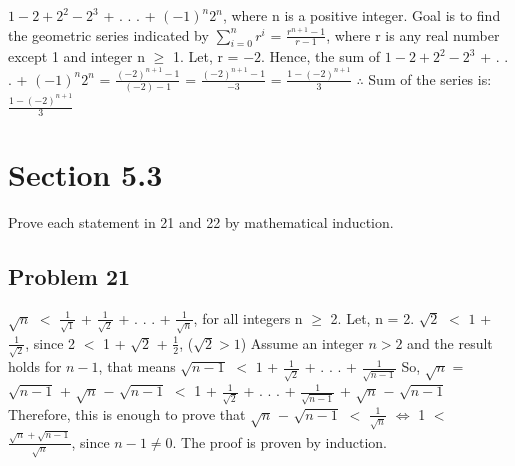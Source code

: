 \documentclass{article}
\begin{document}
	$1 - 2 + 2^{2} - 2^{3}$ + . . . + $(-1)^{n}$$2^{n}$, where n is a positive integer.
	\newline
	Goal is to find the geometric series indicated by $\sum_{i=0}^{n} r^{i}$ = $\frac{r^{n+1}-1}{r-1}$, where r is any real number except 1 and integer n $\geq$ 1.
	\newline
	Let, r = $-2$.
	\newline
	Hence, the sum of $1 - 2 + 2^{2} - 2^{3}$ + . . . + $(-1)^{n}$$2^{n}$ = $\frac{(-2)^{n+1}-1}{(-2)-1}$
	\newline
	= $\frac{(-2)^{n+1}-1}{-3}$
	\newline
	= $\frac{1-(-2)^{n+1}}{3}$
	\newline
	$\therefore$ Sum of the series is: $\frac{1-(-2)^{n+1}}{3}$
	
	
	\section*{Section 5.3}
	Prove each statement in 21 and 22 by mathematical induction.
	\subsection*{Problem 21}
	$\sqrt{n}$ $<$ $\frac{1}{\sqrt{1}}$ + $\frac{1}{\sqrt{2}}$ + . . . + $\frac{1}{\sqrt{n}}$, for all integers n $\geq$ 2.
	\newline
	Let, n = 2.
	\newline
	$\sqrt{2}$ $<$ $1$ + $\frac{1}{\sqrt{2}}$, since 2 $<$ 1 + $\sqrt{2}$ + $\frac{1}{2}$, ($\sqrt{2} > 1$)
	\newline
	Assume an integer $n > 2$ and the result holds for $n-1$,
	\newline
	that means $\sqrt{n-1}$ $<$ $1$ + $\frac{1}{\sqrt{2}}$ + . . . + $\frac{1}{\sqrt{n-1}}$
	\newline
	So, $\sqrt{n}$ = $\sqrt{n-1}$ + $\sqrt{n}$ $-$ $\sqrt{n-1}$ $<$ 1 + $\frac{1}{\sqrt{2}}$ + . . . + $\frac{1}{\sqrt{n-1}}$ + $\sqrt{n}$ $-$ $\sqrt{n-1}$
	\newline
	Therefore, this is enough to prove that $\sqrt{n}$ $-$ $\sqrt{n-1}$ $<$ $\frac{1}{\sqrt{n}}$ $\Leftrightarrow$ 1 $<$ $\frac{\sqrt{n}+\sqrt{n-1}}{\sqrt{n}}$, since $n-1 \neq 0$. The proof is proven by induction.
	
	
\end{document}
